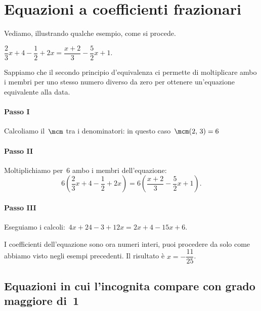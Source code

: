 \section{Equazioni a coefficienti frazionari}
Vediamo, illustrando qualche esempio, come si procede.

\begin{exrig}
 \begin{esempio}
$\dfrac{2}{3}x+4-\dfrac{1}{2}+2x=\dfrac{x+2}{3}-\dfrac{5}{2}x+1$.

Sappiamo che il secondo principio d'equivalenza ci
permette di moltiplicare ambo i membri per uno stesso numero diverso da
zero per ottenere un'equazione equivalente alla data.

\paragraph{Passo I} Calcoliamo il~$\mcm$ tra i denominatori: in questo
caso~$\mcm(2\text{,~}3) = 6$

\paragraph{Passo II} Moltiplichiamo per~6 ambo i membri
dell'equazione:
\[6\left(\dfrac{2}{3}x+4-\dfrac{1}{2}+2x\right)=6\left(\dfrac{x+2}{3}-\dfrac{5}{2}x+1\right).\]

\paragraph{Passo III} Eseguiamo i calcoli:~$4x+24-3+12x=2x+4-15x+6$.

I coefficienti dell'equazione sono ora numeri interi,
puoi procedere da solo come abbiamo visto negli esempi precedenti. Il risultato è $x=-\dfrac{11}{25}$.
\end{esempio}
\end{exrig}

\ovalbox{\risolvi \ref{ese:13.19}}

\subsection{Equazioni in cui l'incognita compare con grado maggiore di~1}

